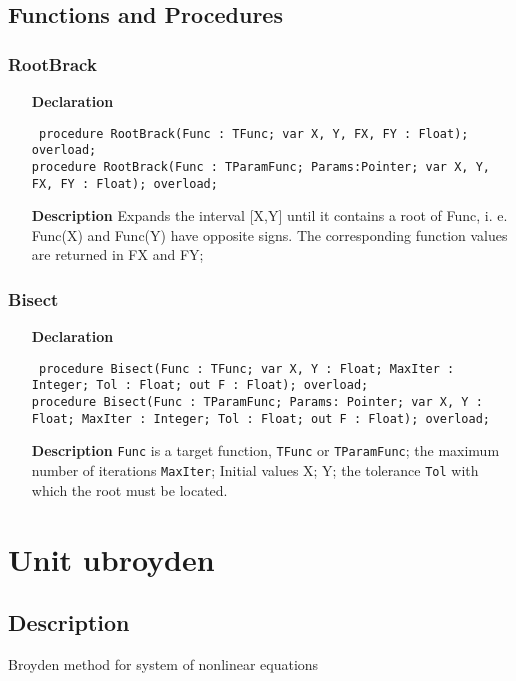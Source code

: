 \documentclass[12pt,a4paper,oneside]{report}
\newcommand{\declarationitem}[1]{\textbf{#1}}
\newcommand{\descriptiontitle}[1]{\textbf{#1}}
\newcommand{\code}[1]{\texttt{#1}}
\begin{document}
\subsection{Functions and Procedures}
\subsubsection{RootBrack}
\label{ubisect-RootBrack}
\begin{itemize}\item[\declarationitem{Declaration}\hfill]
	\begin{flushleft}
		\code{
			procedure RootBrack(Func : TFunc; var X, Y, FX, FY : Float); overload;\\
			procedure RootBrack(Func : TParamFunc; Params:Pointer; var X, Y, FX, FY : Float); overload;}
	\end{flushleft}
	\item[\descriptiontitle{Description}]
	Expands the interval [X,Y] until it contains a root of Func, i. e. Func(X) and Func(Y) have opposite signs. The corresponding function values are returned in FX and FY;
\end{itemize}
\subsubsection{Bisect}
\label{ubisect-Bisect}
\begin{itemize}\item[\declarationitem{Declaration}\hfill]
	\begin{flushleft}
		\code{
			procedure Bisect(Func : TFunc; var X, Y : Float; MaxIter : Integer; Tol : Float; out F : Float); overload;\\
			procedure Bisect(Func : TParamFunc; Params: Pointer; var X, Y : Float; MaxIter : Integer; Tol : Float; out F : Float); overload;}
	\end{flushleft}
	\item[\descriptiontitle{Description}]
	\code{Func} is a target function, \code{TFunc} or \code{TParamFunc}; the maximum number of iterations \code{MaxIter}; Initial values X; Y;  the tolerance \code{Tol} with which the root must be located.
\end{itemize}
\section{Unit ubroyden}
\label{ubroyden}
\subsection{Description}
Broyden method for system of nonlinear equations 
\end{document}
